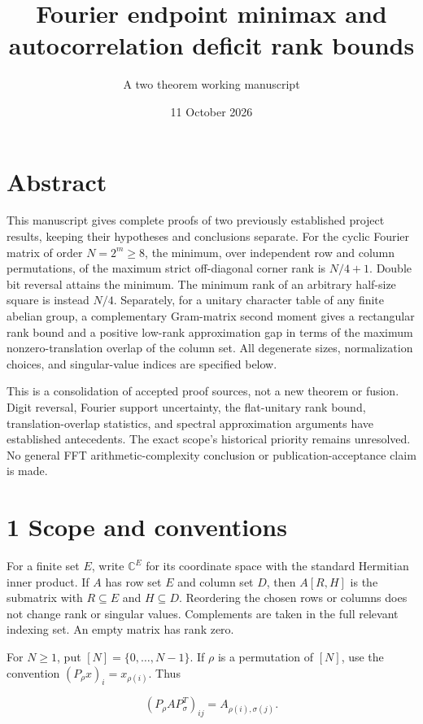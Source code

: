 \documentclass[
  11pt,
  letterpaper,
]{article}
\title{Fourier endpoint minimax and autocorrelation deficit rank bounds}
\subtitle{A two theorem working manuscript}
\author{}
\date{11 October 2026}
\begin{document}
\maketitle

\section{Abstract}\label{abstract}

This manuscript gives complete proofs of two previously established
project results, keeping their hypotheses and conclusions separate. For
the cyclic Fourier matrix of order \(N=2^m\geq8\), the minimum, over
independent row and column permutations, of the maximum strict
off-diagonal corner rank is \(N/4+1\). Double bit reversal attains the
minimum. The minimum rank of an arbitrary half-size square is instead
\(N/4\). Separately, for a unitary character table of any finite abelian
group, a complementary Gram-matrix second moment gives a rectangular
rank bound and a positive low-rank approximation gap in terms of the
maximum nonzero-translation overlap of the column set. All degenerate
sizes, normalization choices, and singular-value indices are specified
below.

This is a consolidation of accepted proof sources, not a new theorem or
fusion. Digit reversal, Fourier support uncertainty, the flat-unitary
rank bound, translation-overlap statistics, and spectral approximation
arguments have established antecedents. The exact scope's historical
priority remains unresolved. No general FFT arithmetic-complexity
conclusion or publication-acceptance claim is made.

\section{1 Scope and conventions}\label{scope-and-conventions}

For a finite set \(E\), write \(\mathbb C^E\) for its coordinate space
with the standard Hermitian inner product. If \(A\) has row set \(E\)
and column set \(D\), then \(A[R,H]\) is the submatrix with
\(R\subseteq E\) and \(H\subseteq D\). Reordering the chosen rows or
columns does not change rank or singular values. Complements are taken
in the full relevant indexing set. An empty matrix has rank zero.

For \(N\geq1\), put \([N]=\{0,\ldots,N-1\}\). If \(\rho\) is a
permutation of \([N]\), use the convention \((P_\rho x)_i=x_{\rho(i)}\).
Thus

\[
(P_\rho A P_\sigma^{T})_{ij}=A_{\rho(i),\sigma(j)}.
\]
\end{document}
